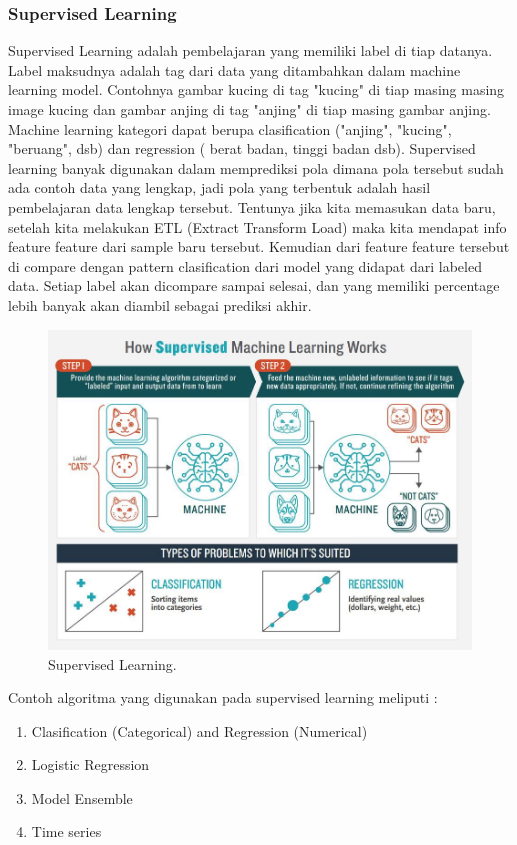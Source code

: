 \subsubsection{Supervised Learning}
\hfill\break
Supervised Learning adalah pembelajaran yang memiliki label di tiap datanya. Label maksudnya adalah tag dari data yang ditambahkan dalam machine learning model. Contohnya gambar kucing di tag "kucing" di tiap masing masing image kucing dan gambar anjing di tag "anjing" di tiap masing gambar anjing. Machine learning kategori dapat berupa clasification ("anjing", "kucing", "beruang", dsb) dan regression ( berat badan, tinggi badan dsb). Supervised learning banyak digunakan dalam memprediksi pola dimana pola tersebut sudah ada contoh data yang lengkap, jadi pola yang terbentuk adalah hasil pembelajaran data lengkap tersebut. Tentunya jika kita memasukan data baru, setelah kita melakukan ETL (Extract Transform Load) maka kita mendapat info feature feature dari sample baru tersebut. Kemudian dari feature feature tersebut di compare dengan pattern clasification dari model yang didapat dari labeled data. Setiap label akan dicompare sampai selesai, dan yang memiliki percentage lebih banyak akan diambil sebagai prediksi akhir.

\begin{figure}[H]
	\includegraphics[width=1\textwidth]{figures/1184077/chapter1/supervisedlearning.jpeg}
	\centering
	\caption{Supervised Learning.}
\end{figure}
\noindent
Contoh algoritma yang digunakan pada supervised learning meliputi :
\begin{enumerate}
	\item Clasification (Categorical) and Regression (Numerical)
    \item Logistic Regression
    \item Model Ensemble
	\item Time series
\end{enumerate}

